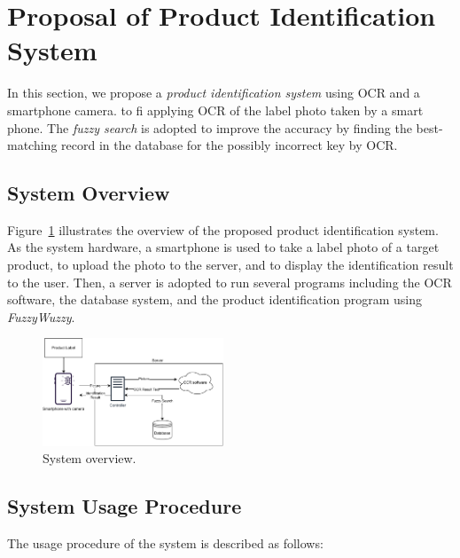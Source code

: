 \documentclass[technicalreport]{ieicej}
\begin{document}
\section{Proposal of Product Identification System}
\label{sec:proposal}
    In this section, we propose a {\em product identification system} using OCR and a smartphone camera.
    to fi applying OCR of the label photo taken by a smart phone. The {\em fuzzy search} is adopted to improve the accuracy by finding the best-matching record in the database for the possibly incorrect key by OCR. 

    \subsection{System Overview}
        Figure~\ref{fig:system} illustrates the overview of the proposed product identification system. As the system hardware, a smartphone is used to take a label photo of a target product, to upload the photo to the server, and to display the identification result to the user. Then, a server is adopted to run several programs including the OCR software, the database system, and the product identification program using {\em FuzzyWuzzy}. 

            \begin{figure}[t] 
                \begin{center}
                \includegraphics[width=0.48\textwidth]{figure/system.pdf}
                \end{center}
                \caption{System overview.}
                \label{fig:system}
            \end{figure}

\subsection{System Usage Procedure}
    The usage procedure of the system is described as follows:
\end{document}

